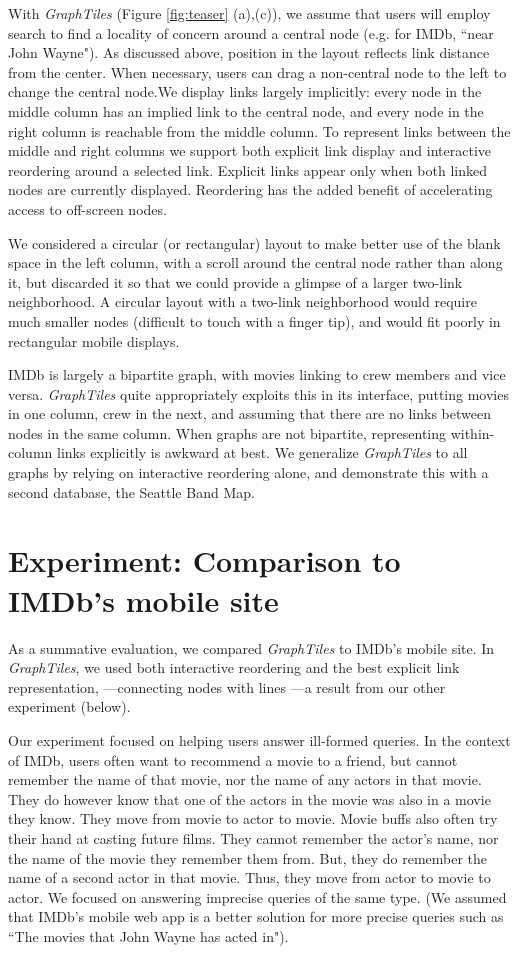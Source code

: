 \documentclass{sigchi}
\begin{document}
With \textit{GraphTiles} (Figure \ref{fig:teaser} (a),(c)), we assume that users will employ search to find a locality of concern around a central node (e.g. for IMDb, ``near John Wayne"). As discussed above, position in the layout reflects link distance from the center. When necessary, users can drag a non-central node to the left to change the central node.We display links largely implicitly: every node in the middle column has an implied link to the central node, and every node in the right column is reachable from the middle column. To represent links between the middle and right columns we support both explicit link display and interactive reordering around a selected link. Explicit links appear only when both linked nodes are currently displayed. Reordering has the added benefit of accelerating access to off-screen nodes.

We considered a circular (or rectangular) layout to make better use of the blank space in the left column, with a scroll around the central node rather than along it, but discarded it so that we could provide a glimpse of a larger two-link neighborhood. A circular layout with a two-link neighborhood would require much smaller nodes (difficult to touch with a finger tip), and would fit poorly in rectangular mobile displays.

IMDb is largely a bipartite graph, with movies linking to crew members and vice versa. \textit{GraphTiles} quite appropriately exploits this in its interface, putting movies in one column, crew in the next, and assuming that there are no links between nodes in the same column. When graphs are not bipartite, representing within-column links explicitly is awkward at best. We generalize \textit{GraphTiles} to all graphs by relying on interactive reordering alone, and demonstrate this with a second database, the Seattle Band Map.


\section{Experiment: Comparison to IMDb's mobile site}

As a summative evaluation, we compared \textit{GraphTiles} to IMDb's mobile site. In \textit{GraphTiles}, we used both interactive reordering and the best explicit link representation, ---connecting nodes with lines ---a result from our other experiment (below). 

Our experiment focused on helping users answer ill-formed queries. In the context of IMDb, users often want to recommend a movie to a friend, but cannot remember the name of that movie, nor the name of any actors in that movie. They do however know that one of the actors in the movie was also in a movie they know. They move from movie to actor to movie. Movie buffs also often try their hand at casting future films. They cannot remember the actor's name, nor the name of the movie they remember them from. But, they do remember the name of a second actor in that movie. Thus, they move from actor to movie to actor.
We focused on answering imprecise queries of the same type. (We assumed that IMDb's mobile web app is a better solution for more precise queries such as ``The movies that John Wayne has acted in"). 
\end{document}
